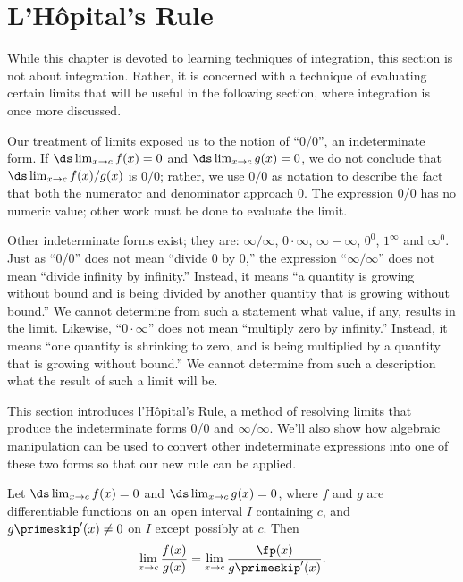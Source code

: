 \section{L'H\^opital's Rule}\label{sec:lhopitals_rule}

While this chapter is devoted to learning techniques of integration, this section is not about integration. Rather, it is concerned with a technique of evaluating certain limits that will be useful in the following section, where integration is once more discussed.

Our treatment of limits exposed us to the notion of ``0/0'', an indeterminate form. If $\ds \lim_{x\to c}f(x)=0$ and $\ds \lim_{x\to c} g(x) =0$, we do not conclude that $\ds \lim_{x\to c} f(x)/g(x)$ is $0/0$; rather, we use $0/0$ as notation to describe the fact that both the numerator and denominator approach 0. The expression 0/0 has no numeric value; other work must be done to evaluate the limit.

Other indeterminate forms exist; they are: %
 $\infty/\infty$, $0\cdot\infty$, $\infty-\infty$, $0^0$, $1^\infty$ and $\infty^0$. %
 Just as ``0/0'' does not mean ``divide 0 by 0,'' the expression ``$\infty/\infty$'' does not mean ``divide infinity by infinity.'' Instead, it means ``a quantity is growing without bound and is being divided by another quantity that is growing without bound.'' We cannot determine from such a statement what value, if any, results in the limit. Likewise, ``$0\cdot \infty$'' does not mean ``multiply zero by infinity.'' Instead, it means ``one quantity is shrinking to zero, and is being multiplied by a quantity that is growing without bound.'' We cannot determine from such a description what the result of such a limit will be.

This section introduces l'H\^opital's Rule, a method of resolving limits that produce the indeterminate forms 0/0 and $\infty/\infty$. We'll also show how algebraic manipulation can be used to convert other indeterminate expressions into one of these two forms so that our new rule can be applied.

{Let $\ds \lim_{x\to c}f(x) = 0$ and $\ds \lim_{x\to c}g(x)=0$, where $f$ and $g$ are differentiable functions on an open interval $I$ containing $c$, and $g\primeskip'(x)\neq 0$ on $I$ except possibly at $c$. Then 
$$ \lim_{x\to c} \frac{f(x)}{g(x)} = \lim_{x\to c} \frac{\fp(x)}{g\primeskip'(x)}.$$
}

